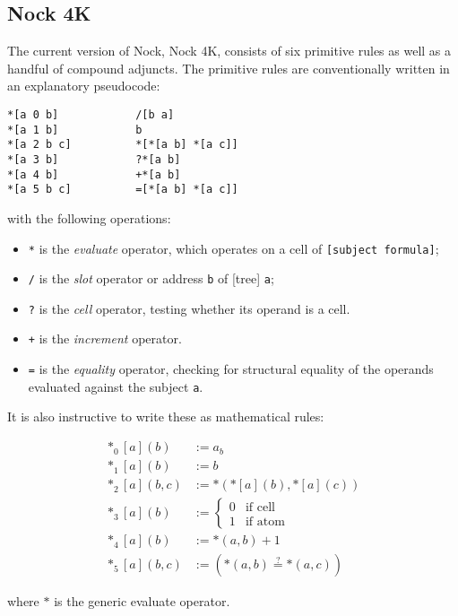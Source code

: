 \subsection{Nock 4K}

The current version of Nock, Nock 4K, consists of six primitive rules as well as a handful of compound adjuncts.  The primitive rules are conventionally written in an explanatory pseudocode:

\begin{lstlisting}[style=nonumbers]
*[a 0 b]            /[b a]
*[a 1 b]            b
*[a 2 b c]          *[*[a b] *[a c]]
*[a 3 b]            ?*[a b]
*[a 4 b]            +*[a b]
*[a 5 b c]          =[*[a b] *[a c]]
\end{lstlisting}

with the following operations:

\begin{itemize}
  \item  \texttt{*} is the \emph{evaluate} operator, which operates on a cell of \texttt{[subject formula]};
  \item  \texttt{/} is the \emph{slot} operator or address \texttt{b} of [tree] \texttt{a};
  \item  \texttt{?} is the \emph{cell} operator, testing whether its operand is a cell.
  \item  \texttt{+} is the \emph{increment} operator.
  \item  \texttt{=} is the \emph{equality} operator, checking for structural equality of the operands evaluated against the subject \texttt{a}.
\end{itemize}

It is also instructive to write these as mathematical rules:

\begin{align}
*_{0}[a](b) &:= a_{b} \\
*_{1}[a](b) &:= b \\
*_{2}[a](b,c) &:= *({*[a](b)}, {*[a](c)}) \\
*_{3}[a](b) &:= \left\{\begin{matrix} 0 & \text{if cell} \\ 1 & \text{if atom} \end{matrix} \right. \\
*_{4}[a](b) &:= {*(a,b) + 1} \\
*_{5}[a](b,c) &:= ({*(a,b)} \stackrel{?}{=} {*(a,c)})
\end{align}

where $*$ is the generic evaluate operator.

